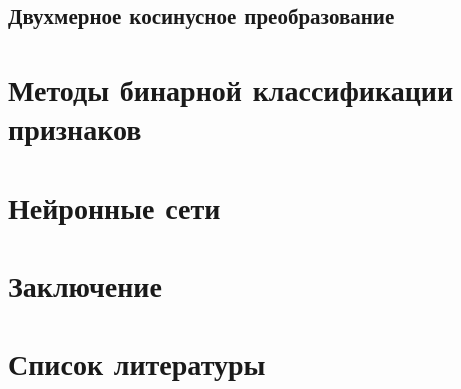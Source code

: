 \documentclass[a4paper, 12pt]{article}		%
\begin{document}
\subsection{Двухмерное косинусное преобразование}

\section{Методы бинарной классификации признаков}

\section{Нейронные сети}


\newpage
\section*{Заключение}


\newpage
\section*{Список литературы}
\end{document}
